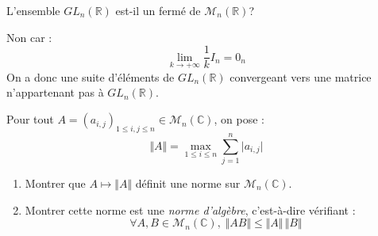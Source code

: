 \documentclass[a4paper,10pt]{report}
\begin{document}
\begin{Exercice}{} L'ensemble $GL_n(\mathbb{R})$ est-il un fermé de $\mathcal{M}_n(\mathbb{R})$?
\end{Exercice} 

\corr Non car :
$$ \lim_{k \rightarrow + \infty} \dfrac{1}{k} I_n = 0_n$$
On a donc une suite d'éléments de $GL_n(\mathbb{R})$ convergeant vers une matrice n'appartenant pas à $GL_n(\mathbb{R})$.

\begin{Exercice}{} Pour tout $A = (a_{i,j})_{1 \leq i,j \leq n} \in \mathcal{M}_{n}(\mathbb{C})$, on pose :
  \[
  \Vert A \Vert = \max_{1 \leq i \leq n} \sum_{j = 1}^{n}  \vert a_{i,j} \vert
  \]
  \begin{enumerate}
  \item Montrer que $A \mapsto \Vert A \Vert$ définit une norme sur $\mathcal{M}_{n}(\mathbb{C})$.
  \item Montrer cette norme est une \textit{norme d'algèbre}, c'est-à-dire vérifiant :
    \[
    \forall A,B \in \mathcal{M}_{n}(\mathbb{C}),  \; \Vert AB \Vert \leq \Vert A \Vert \, \Vert B \Vert
    \]
  \end{enumerate}
\end{Exercice}

\corr 
\end{document}
